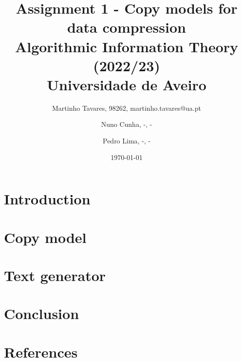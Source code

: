 \documentclass{article}
\begin{document}
\title{
    Assignment 1 - Copy models for data compression \\
    \large{Algorithmic Information Theory (2022/23) \\
    Universidade de Aveiro}
}

\author{
    Martinho Tavares, 98262, martinho.tavares@ua.pt \and
    Nuno Cunha, -, - \and
    Pedro Lima, -, -
}

\maketitle
\date{\today}

\nocite{*}

\section{Introduction}

\section{Copy model}

\section{Text generator}

\section{Conclusion}

\section{References}


\end{document}
